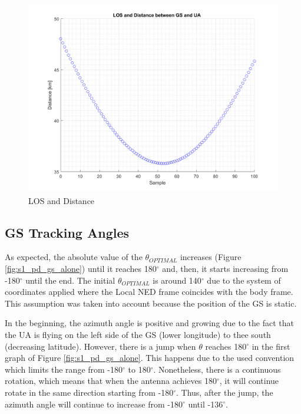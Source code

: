 \begin{figure}[H]
	\centering
	\includegraphics[scale=0.7]{figures/s1_los.png}
	\caption{LOS and Distance}
	\label{fig:s1_los}
\end{figure}

\subsection*{GS Tracking Angles}\label{GroundStation_scenario1}
As expected, the absolute value of the $\theta_{OPTIMAL}$ increases (Figure \ref{fig:s1_pd_gs_alone}) until it reaches 180$^{\circ}$  and, then, it starts increasing from -180$^{\circ}$ until the end. The initial $\theta_{OPTIMAL}$ is around 140$^{\circ}$ due to the system of coordinates applied where the Local NED frame coincides with the body frame. This assumption was taken into account because the position of the GS is static.

In the beginning, the azimuth angle is positive and growing due to the fact that the UA is flying on the left side of the GS (lower longitude) to thee south (decreasing latitude). However, there is a jump when $\theta$ reaches 180$^{\circ}$ in the first graph of Figure \ref{fig:s1_pd_gs_alone}. This happens due to the used convention which limits the range from -180$^{\circ}$ to 180$^{\circ}$. Nonetheless, there is a continuous rotation, which means that when the antenna achieves 180$^{\circ}$, it will continue rotate in the same direction starting from -180$^{\circ}$. Thus, after the jump, the azimuth angle will continue to increase from -180$^{\circ}$ until -136$^{\circ}$.

